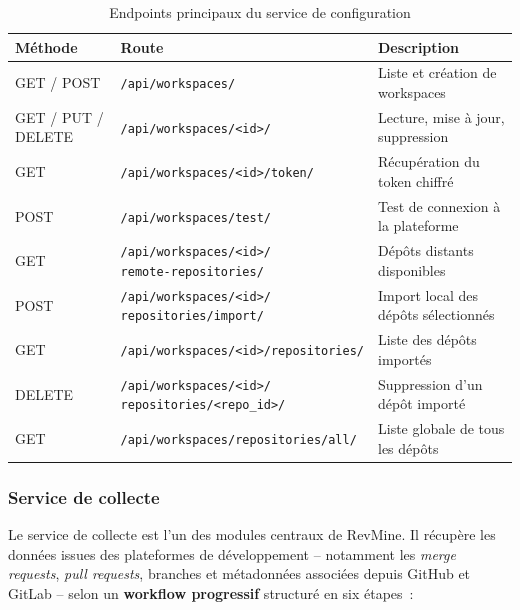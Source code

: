 \begin{table}[H]
\centering
\small
\caption{Endpoints principaux du service de configuration}
\label{tab:endpoints-config}
\begin{tabular}{|>{\centering\arraybackslash}p{2cm}
                |>{\raggedright\arraybackslash}p{7cm}
                |>{\raggedright\arraybackslash}p{3.5cm}|}
\hline
\textbf{Méthode} & \textbf{Route} & \textbf{Description} \\
\hline
GET / POST & \texttt{/api/workspaces/} & Liste et création de workspaces \\
\hline
GET / PUT / DELETE & \texttt{/api/workspaces/<id>/} & Lecture, mise à jour, suppression \\
\hline
GET & \texttt{/api/workspaces/<id>/token/} & Récupération du token chiffré \\
\hline
POST & \texttt{/api/workspaces/test/} & Test de connexion à la plateforme \\
\hline
GET & \makecell[l]{\texttt{/api/workspaces/<id>/} \\ \texttt{remote-repositories/}} & Dépôts distants disponibles \\
\hline
POST & \makecell[l]{\texttt{/api/workspaces/<id>/} \\ \texttt{repositories/import/}} & Import local des dépôts sélectionnés \\
\hline
GET & \texttt{/api/workspaces/<id>/repositories/} & Liste des dépôts importés \\
\hline
DELETE & \makecell[l]{\texttt{/api/workspaces/<id>/} \\ \texttt{repositories/<repo\_id>/}} & Suppression d'un dépôt importé \\
\hline
GET & \texttt{/api/workspaces/repositories/all/} & Liste globale de tous les dépôts \\
\hline
\end{tabular}
\end{table}

\subsubsection{Service de collecte}

Le service de collecte est l'un des modules centraux de RevMine. Il récupère les données issues
des plateformes de développement -- notamment les \textit{merge requests}, \textit{pull requests},
branches et métadonnées associées depuis GitHub et GitLab -- selon un \textbf{workflow progressif}
structuré en six étapes~:

